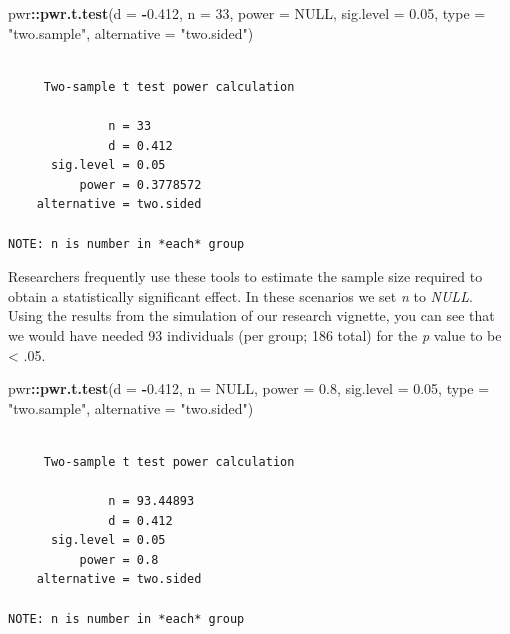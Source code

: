 \documentclass[
  11pt,
]{book}
\newenvironment{Shaded}{\begin{snugshade}}{\end{snugshade}}
\newcommand{\AttributeTok}[1]{\textcolor[rgb]{0.27,0.27,0.27}{#1}}
\newcommand{\ConstantTok}[1]{\textcolor[rgb]{0.37,0.37,0.37}{#1}}
\newcommand{\DecValTok}[1]{\textcolor[rgb]{0.06,0.06,0.06}{#1}}
\newcommand{\FloatTok}[1]{\textcolor[rgb]{0.06,0.06,0.06}{#1}}
\newcommand{\FunctionTok}[1]{\textcolor[rgb]{0.27,0.27,0.27}{\textbf{#1}}}
\newcommand{\NormalTok}[1]{#1}
\newcommand{\SpecialCharTok}[1]{\textcolor[rgb]{0.43,0.43,0.43}{\textbf{#1}}}
\newcommand{\StringTok}[1]{\textcolor[rgb]{0.5,0.5,0.5}{#1}}
\begin{document}
\begin{Shaded}
\begin{Highlighting}[]
\NormalTok{pwr}\SpecialCharTok{::}\FunctionTok{pwr.t.test}\NormalTok{(}\AttributeTok{d =} \SpecialCharTok{{-}}\FloatTok{0.412}\NormalTok{, }\AttributeTok{n =} \DecValTok{33}\NormalTok{, }\AttributeTok{power =} \ConstantTok{NULL}\NormalTok{, }\AttributeTok{sig.level =} \FloatTok{0.05}\NormalTok{, }\AttributeTok{type =} \StringTok{"two.sample"}\NormalTok{,}
    \AttributeTok{alternative =} \StringTok{"two.sided"}\NormalTok{)}
\end{Highlighting}
\end{Shaded}

\begin{verbatim}

     Two-sample t test power calculation 

              n = 33
              d = 0.412
      sig.level = 0.05
          power = 0.3778572
    alternative = two.sided

NOTE: n is number in *each* group
\end{verbatim}

Researchers frequently use these tools to estimate the sample size required to obtain a statistically significant effect. In these scenarios we set \emph{n} to \emph{NULL}. Using the results from the simulation of our research vignette, you can see that we would have needed 93 individuals (per group; 186 total) for the \emph{p} value to be \textless{} .05.

\begin{Shaded}
\begin{Highlighting}[]
\NormalTok{pwr}\SpecialCharTok{::}\FunctionTok{pwr.t.test}\NormalTok{(}\AttributeTok{d =} \SpecialCharTok{{-}}\FloatTok{0.412}\NormalTok{, }\AttributeTok{n =} \ConstantTok{NULL}\NormalTok{, }\AttributeTok{power =} \FloatTok{0.8}\NormalTok{, }\AttributeTok{sig.level =} \FloatTok{0.05}\NormalTok{, }\AttributeTok{type =} \StringTok{"two.sample"}\NormalTok{,}
    \AttributeTok{alternative =} \StringTok{"two.sided"}\NormalTok{)}
\end{Highlighting}
\end{Shaded}

\begin{verbatim}

     Two-sample t test power calculation 

              n = 93.44893
              d = 0.412
      sig.level = 0.05
          power = 0.8
    alternative = two.sided

NOTE: n is number in *each* group
\end{verbatim}
\end{document}
